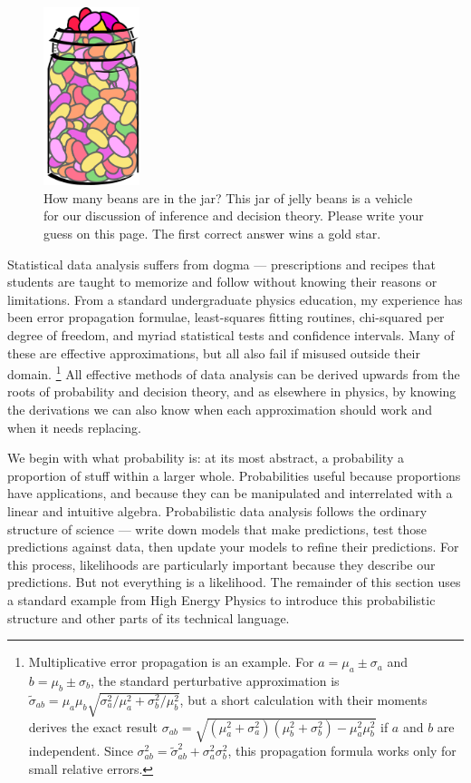 \begin{figure}[tp]
\centering
\includegraphics[width=0.25\textwidth]{figures/searches_beans.pdf}
\caption[
How many beans are in the jar?
]{%
How many beans are in the jar? This jar of jelly beans is a vehicle for our
discussion of inference and decision theory.
Please write your guess on this page.
The first correct answer wins a gold star.
}
\label{fig:searches_beans}
\end{figure}

Statistical data analysis suffers from dogma --- prescriptions and recipes that
students are taught to memorize and follow without knowing their reasons or
limitations.
From a standard undergraduate physics education, my experience has been
error propagation formulae,
least-squares fitting routines,
chi-squared per degree of freedom,
and myriad statistical tests and confidence intervals.
Many of these are effective approximations, but all also fail if misused
outside their domain.%
\footnote{%
Multiplicative error propagation is an example.
For $a = \mu_a \pm \sigma_a$ and $b = \mu_b \pm \sigma_b$,
the standard perturbative approximation is
\(
\widetilde{\sigma}_{ab}
= \mu_a \mu_b \sqrt{\sigma_a^2/\mu_a^2 + \sigma_b^2/\mu_b^2}
\),
but a short calculation with their moments derives the exact result
\(
\sigma_{ab}
= \sqrt{(\mu_a^2 + \sigma_a^2)(\mu_b^2 + \sigma_b^2) - \mu_a^2\mu_b^2}
\)
if $a$ and $b$ are independent.
Since $\sigma_{ab}^2 = \widetilde{\sigma}_{ab}^2 + \sigma_a^2 \sigma_b^2$, this
propagation formula works only for small relative errors.
}
All effective methods of data analysis can be derived upwards from the roots of
probability and decision theory, and as elsewhere in physics, by knowing the
derivations we can also know when each approximation should work and when it
needs replacing.

We begin with what probability is: at its most abstract, a probability a
proportion of stuff within a larger whole.
Probabilities useful because proportions have applications, and because they
can be manipulated and interrelated with a linear and intuitive algebra.
Probabilistic data analysis follows the ordinary structure of science ---
write down models that make predictions, test those predictions against data,
then update your models to refine their predictions.
For this process, likelihoods are particularly important because they describe
our predictions. But not everything is a likelihood.
The remainder of this section uses a standard example from High Energy Physics
to introduce this probabilistic structure and other parts of its technical
language.

